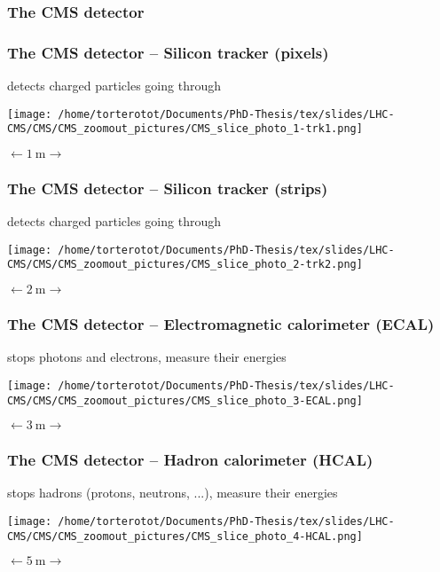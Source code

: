 \begin{frame}
\frametitle{The CMS detector}
\end{frame}
\begin{frame}\addtocounter{framenumber}{-1}
\frametitle{The CMS detector -- Silicon tracker (pixels)}
\begin{center}
detects charged particles going through

\vfill

\texttt{[image: /home/torterotot/Documents/PhD-Thesis/tex/slides/LHC-CMS/CMS/CMS\_zoomout\_pictures/CMS\_slice\_photo\_1-trk1.png]}

\vfill

$\longleftarrow \SI{1}{\meter} \longrightarrow$
\end{center}
\end{frame}
\begin{frame}\addtocounter{framenumber}{-1}
\frametitle{The CMS detector -- Silicon tracker (strips)}
\begin{center}
detects charged particles going through

\vfill

\texttt{[image: /home/torterotot/Documents/PhD-Thesis/tex/slides/LHC-CMS/CMS/CMS\_zoomout\_pictures/CMS\_slice\_photo\_2-trk2.png]}

\vfill

$\longleftarrow \SI{2}{\meter} \longrightarrow$
\end{center}
\end{frame}
\begin{frame}\addtocounter{framenumber}{-1}
\frametitle{The CMS detector -- Electromagnetic calorimeter (ECAL)}
\begin{center}
stops photons and electrons, measure their energies

\vfill

\texttt{[image: /home/torterotot/Documents/PhD-Thesis/tex/slides/LHC-CMS/CMS/CMS\_zoomout\_pictures/CMS\_slice\_photo\_3-ECAL.png]}

\vfill

$\longleftarrow \SI{3}{\meter} \longrightarrow$
\end{center}
\end{frame}
\begin{frame}\addtocounter{framenumber}{-1}
\frametitle{The CMS detector -- Hadron calorimeter (HCAL)}
\begin{center}
stops hadrons (protons, neutrons, ...), measure their energies

\vfill

\texttt{[image: /home/torterotot/Documents/PhD-Thesis/tex/slides/LHC-CMS/CMS/CMS\_zoomout\_pictures/CMS\_slice\_photo\_4-HCAL.png]}

\vfill

$\longleftarrow \SI{5}{\meter} \longrightarrow$
\end{center}
\end{frame}
